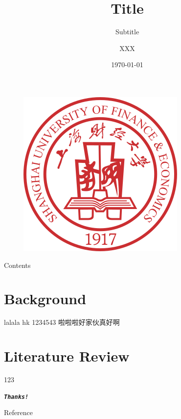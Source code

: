 \documentclass[UTF8, 16pt]{beamer}
\author[XXX] %
{
XXX
}
\title[Title]{Title}
\subtitle{Subtitle}
\institute[SUFE]
{
Shanghai University of Finance and Economics
}
\date{\today}
\begin{document}
\begin{CJK*}{UTF8}{gbsn}

\begin{frame}[noframenumbering]
	\titlepage
	\vspace{-0.5cm}
    \begin{figure}[htpb] 
        \begin{center}
            \includegraphics[width=0.19 \linewidth]{sufe_logo.png}
        \end{center}  
    \end{figure}
\end{frame}

\begin{frame}{Contents}
	\tableofcontents[sectionstyle=show,
 	subsectionstyle=show/shaded/hide,
 	subsubsectionstyle=show/shaded/hide]
\end{frame}

\section{Background}

\begin{frame}{lalala}
	\textcolor{sufered}{hk}
	1234543
	\cite{Greiner2008}
	啦啦啦好家伙真好啊
\end{frame}

\section{Literature Review}
\begin{frame}
	123
\end{frame}



\begin{frame}[allowframebreaks]%
	\begin{center}
		\Huge\textbf{\textit{\texttt{Thanks!}}}
	\end{center}
\end{frame}

\begin{frame}{Reference}
	\addtocounter{framenumber}{-1}
	\printbibliography %
\end{frame}


\end{CJK*}
\end{document}
